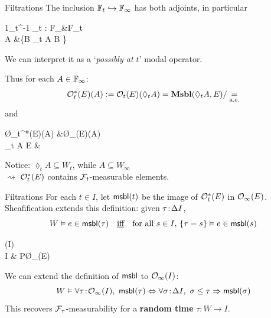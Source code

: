 \begin{frame}{Filtrations}
	The inclusion $\mathbb{F}_t \hookrightarrow \mathbb{F}_\infty$ has both adjoints, in particular
	\begin{eqalign*}
		1_t^{-1} \dashv \lozenge_t : \alg F_\infty &\longto \alg F_t\\
						A	&\longmapsto \bigwedge \{B \in \F_t \suchthat A \leq B \}
	\end{eqalign*}
	{\color{colorgold}We can interpret it as a `\textit{possibly at $t$}' modal operator.}

	\vfill
	Thus for each $A \in \mathbb{F}_\infty$:
	\begin{equation*}
		\mathcal{O}_t^*(E)(A) := \mathcal{O}_t(E)(\lozenge_t A) = \mathbf{Msbl}(\lozenge_t A, E) / \underset{\text{a.e.}}{=}
	\end{equation*}
	and
	\begin{eqalign*}
		\O_t^*(E)(A) &\longto \O_\infty(E)(A)\\
		{\color{colorgold}\lozenge_t A  E} &\longmapsto {\color{colorgold}A \into \lozenge_t A \nto{f} E}
	\end{eqalign*}
	Notice: $\lozenge_t A \subseteq W_t$, while $A \subseteq W_\infty$\\
	\hspace*{3ex} {\color{colorgold}$\rightsquigarrow$ $\mathcal{O}^*_t(E)$ contains $\mathcal{F}_t$-measurable elements}.
\end{frame}

\begin{frame}{Filtrations}
	For each $t \in I$, let {\color{colorgold}$\mathsf{msbl}(t)$} be the image of $\mathcal{O}_t^*(E)$ in $\mathcal{O}_\infty(E)$.\\[1ex]
	Sheafification extends this definition: given $\tau \!:\! \Delta I$,
	\begin{equation*}
		W \vDash e \in \mathsf{msbl}(\tau) \quad\text{\underline{iff}}\quad \text{for all $s \in I$, $\{\tau = s\} \vDash e \in \mathsf{msbl}(s)$}
	\end{equation*}

	\vfill
	\begin{diagram*}
		(I)  \arrow[swap]{d}{\eta_\aetop}\\
		\Delta I  \& P\O_\infty(E)
	\end{diagram*}

	\vfill
	We can extend the definition of $\mathsf{msbl}$ to $\mathcal{O}_\infty(I)$:
	\begin{equation*}
		W \forces \forall \tau \tin \O_\infty(I),\ \msbl(\tau) \Leftrightarrow \forall \sigma \tin \Delta I,\ \sigma \leq \tau \hey \msbl(\sigma)
	\end{equation*}
	This recovers $\mathcal{F}_\tau$-measurability for a \textbf{random time} $\tau : W \to I$.
\end{frame}

